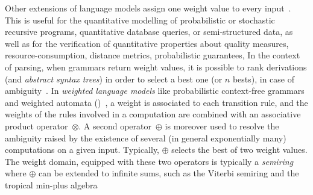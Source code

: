 Other extensions of language models  %
assign one weight value to every input~\cite{Droste09handbook}.
This is useful for the quantitative modelling of
\eg probabilistic or stochastic recursive programs, %
quantitative database queries, or semi-structured data, %
as well as for the verification of quantitative properties about 
quality measures, resource-consumption, distance metrics, probabilistic guarantees, \etc
%
In the context of parsing, when grammars return weight values, 
it is possible to rank derivations (and \emph{abstract syntax trees})
in order to select a best one (or $n$ bests),
\eg in case of ambiguity~\cite{Goodman99SemiringParsing,Nederhof03weightedParsing,MorbitzVogler19weighted-parsing}.
%
In \emph{weighted language models}
like \eg probabilistic context-free grammars %
and weighted automata (\WA)~\cite{Droste09handbook},
a weight is associated to each transition rule, %
and the weights of the rules involved in a computation are combined with an
associative product operator~$\otimes$. %
A second operator~$\oplus$
is moreover used to resolve the ambiguity raised by the existence
of several (in general exponentially many) computations on a given input.
Typically, $\oplus$ selects the best of two weight values.
The weight domain, equipped with these two operators is typically 
a \emph{semiring} %
where $\oplus$ can be extended to infinite sums,
such as the Viterbi semiring and the tropical min-plus algebra%

